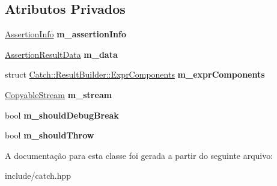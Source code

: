 \subsection*{Atributos Privados}
\begin{DoxyCompactItemize}
\item 
\hyperlink{structCatch_1_1AssertionInfo}{Assertion\+Info} {\bfseries m\+\_\+assertion\+Info}\hypertarget{classCatch_1_1ResultBuilder_a63a4d1afd96793f5ce68b7b66e42cad5}{}\label{classCatch_1_1ResultBuilder_a63a4d1afd96793f5ce68b7b66e42cad5}

\item 
\hyperlink{structCatch_1_1AssertionResultData}{Assertion\+Result\+Data} {\bfseries m\+\_\+data}\hypertarget{classCatch_1_1ResultBuilder_a631c2d5d82c240c8d1754ce40f108b13}{}\label{classCatch_1_1ResultBuilder_a631c2d5d82c240c8d1754ce40f108b13}

\item 
struct \hyperlink{structCatch_1_1ResultBuilder_1_1ExprComponents}{Catch\+::\+Result\+Builder\+::\+Expr\+Components} {\bfseries m\+\_\+expr\+Components}\hypertarget{classCatch_1_1ResultBuilder_a08bc02ca377844e2d7fe10593ccc5d22}{}\label{classCatch_1_1ResultBuilder_a08bc02ca377844e2d7fe10593ccc5d22}

\item 
\hyperlink{structCatch_1_1CopyableStream}{Copyable\+Stream} {\bfseries m\+\_\+stream}\hypertarget{classCatch_1_1ResultBuilder_aa30f0aa874c8f2369862b44acbcab5c3}{}\label{classCatch_1_1ResultBuilder_aa30f0aa874c8f2369862b44acbcab5c3}

\item 
bool {\bfseries m\+\_\+should\+Debug\+Break}\hypertarget{classCatch_1_1ResultBuilder_aaa0653a25c1ebfde5cea3438392e7a9b}{}\label{classCatch_1_1ResultBuilder_aaa0653a25c1ebfde5cea3438392e7a9b}

\item 
bool {\bfseries m\+\_\+should\+Throw}\hypertarget{classCatch_1_1ResultBuilder_a635ae36960c8122559e20585ae2d0b08}{}\label{classCatch_1_1ResultBuilder_a635ae36960c8122559e20585ae2d0b08}

\end{DoxyCompactItemize}


A documentação para esta classe foi gerada a partir do seguinte arquivo\+:\begin{DoxyCompactItemize}
\item 
include/catch.\+hpp\end{DoxyCompactItemize}
